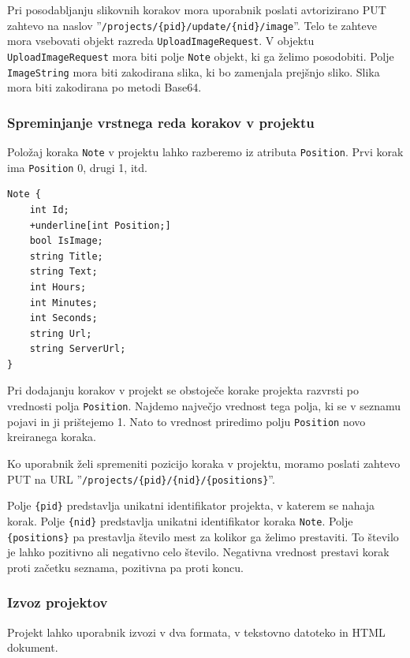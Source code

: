 \documentclass[a4paper, 12pt]{book}
\begin{document}
Pri posodabljanju slikovnih korakov mora uporabnik poslati avtorizirano PUT zahtevo na naslov ''\texttt{/projects/\{pid\}/update/\{nid\}/image}''.
Telo te zahteve mora vsebovati objekt razreda \texttt{UploadImageRequest}.
V objektu \texttt{UploadImageRequest} mora biti polje \texttt{Note} objekt, ki ga želimo posodobiti.
Polje \texttt{ImageString} mora biti zakodirana slika, ki bo zamenjala prejšnjo sliko.
Slika mora biti zakodirana po metodi Base64.

\subsubsection{Spreminjanje vrstnega reda korakov v projektu}

Položaj koraka \texttt{Note} v projektu lahko razberemo iz atributa \texttt{Position}.
Prvi korak ima \texttt{Position} 0, drugi 1, itd.

\begin{Verbatim}[commandchars=+\[\]]
Note { 
    int Id; 
    +underline[int Position;]
    bool IsImage;  
    string Title; 
    string Text;
    int Hours; 
    int Minutes;
    int Seconds;
    string Url;
    string ServerUrl;
}
\end{Verbatim}

Pri dodajanju korakov v projekt se obstoječe korake projekta razvrsti po vrednosti polja \texttt{Position}.
Najdemo največjo vrednost tega polja, ki se v seznamu pojavi in ji prištejemo 1.
Nato to vrednost priredimo polju \texttt{Position} novo kreiranega koraka.

Ko uporabnik želi spremeniti pozicijo koraka v projektu, moramo poslati zahtevo PUT na URL ''\texttt{/projects/\{pid\}/\{nid\}/\{positions\}}''.

Polje \texttt{\{pid\}} predstavlja unikatni identifikator projekta, v katerem se nahaja korak.
Polje \texttt{\{nid\}} predstavlja unikatni identifikator koraka \texttt{Note}.
Polje \texttt{\{positions\}} pa prestavlja število mest za kolikor ga želimo prestaviti.
To število je lahko pozitivno ali negativno celo število.
Negativna vrednost prestavi korak proti začetku seznama, pozitivna pa proti koncu.

\subsubsection{Izvoz projektov}

Projekt lahko uporabnik izvozi v dva formata, v tekstovno datoteko in HTML dokument.
\end{document}
